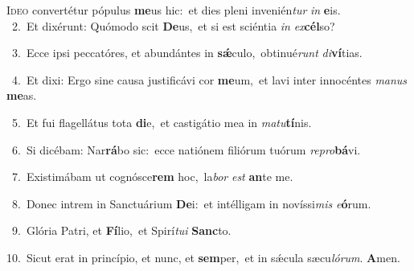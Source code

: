 \lettrine{\initial\textcolor{\initialcolor}{I}}{deo} convertétur pópulus \textbf{me}\-us hic:~\star et dies pleni invenién\textit{tur} \textit{in} \textbf{e}\-is.\\
{\numbfont\textcolor{\numbcolor}{~2.}}~Et dixérunt: Quómodo scit \textbf{De}\-us,~\star et si est sciéntia \textit{in} \textit{ex}\-\textbf{cél}so?\par
{\numbfont\textcolor{\numbcolor}{~3.}}~Ecce ipsi peccatóres, et abundántes in \textbf{sǽ}\-culo,~\star obtinué\textit{runt} \textit{di}\-\textbf{ví}tias.\par
{\numbfont\textcolor{\numbcolor}{~4.}}~Et dixi: Ergo sine causa justificávi cor \textbf{me}\-um,~\star et lavi inter innocéntes \textit{ma}\-\textit{nus} \textbf{me}\-as.\par
{\numbfont\textcolor{\numbcolor}{~5.}}~Et fui flagellátus tota \textbf{di}\-e,~\star et castigátio mea in \textit{ma}\-\textit{tu}\textbf{tí}nis.\par
{\numbfont\textcolor{\numbcolor}{~6.}}~Si dicébam: Nar\-\textbf{rá}\-bo sic:~\star ecce natiónem filiórum tuórum \textit{re}\-\textit{pro}\textbf{bá}vi.\par
{\numbfont\textcolor{\numbcolor}{~7.}}~Existimábam ut cognósce\textbf{rem} hoc,~\star la\textit{bor} \textit{est} \textbf{an}\-te me.\par
{\numbfont\textcolor{\numbcolor}{~8.}}~Donec intrem in Sanctuárium \textbf{De}\-i:~\star et intélligam in novíssi\textit{mis} \textit{e}\-\textbf{ó}rum.\par
{\numbfont\textcolor{\numbcolor}{~9.}}~Glória Patri, et \textbf{Fí}\-lio,~\star et Spirí\-\textit{tu}\-\textit{i} \textbf{Sanc}\-to.\par
{\numbfont\textcolor{\numbcolor}{10.}}~Sicut erat in princípio, et nunc, et \textbf{sem}\-per,~\star et in sǽcula sæcu\-\textit{ló}\-\textit{rum}. \textbf{A}\-men.\par

